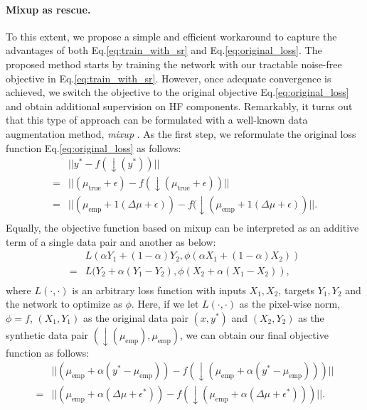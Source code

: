 \documentclass[letterpaper]{article} %
\begin{document}
\paragraph{Mixup as rescue.}
To this extent, we propose a simple and efficient workaround to capture the advantages of both Eq.\eqref{eq:train_with_sr} and Eq.\eqref{eq:original_loss}. The proposed method starts by training the network with our tractable noise-free objective in Eq.\eqref{eq:train_with_sr}. However, once adequate convergence is achieved, we switch the objective to the original objective Eq.\eqref{eq:original_loss} and obtain additional supervision on HF components. 
%
Remarkably, it turns out that this type of approach can be formulated with a well-known data augmentation method, \textit{mixup} \cite{mixup}. As the first step, we reformulate the original loss function Eq.\eqref{eq:original_loss} as follows:
\begin{equation}\label{eq:original_loss_in_mixupform}
    \begin{aligned}
        &||y^* - f(\downarrow(y^*))|| \\
        =&||(\mu_{\text{true}} + \epsilon) - f(\downarrow(\mu_{\text{true}} + \epsilon))|| \\
        =&||(\mu_{\text{emp}}+ 1(\Delta\mu+\epsilon)) - f(\downarrow(\mu_{\text{emp}} + 1(\Delta\mu+\epsilon))||. \\
    \end{aligned}
\end{equation}
Equally, the objective function based on mixup can be interpreted as an additive term of a single data pair and another as below:
\begin{equation}
    \begin{aligned}
        &L(\alpha Y_1 + (1-\alpha) Y_2, \phi(\alpha X_1 + (1-\alpha) X_2)) \\
        =&L(Y_2 + \alpha (Y_1 - Y_2), \phi(X_2 + \alpha (X_1 - X_2)), \\
    \end{aligned}
\end{equation}
where $L(\cdot,\cdot)$ is an arbitrary loss function with inputs $X_1, X_2$, targets $Y_1, Y_2$ and the network to optimize as $\phi$. Here, if we let $L(\cdot,\cdot)$ as the pixel-wise norm, $\phi=f$, $(X_1, Y_1)$ as the original data pair $(x, y^*)$ and $(X_2, Y_2)$ as the synthetic data pair $(\downarrow(\mu_\text{emp}),\mu_\text{emp})$, we can obtain our final objective function as follows:
\begin{equation}
    \label{eq:final_w_mixup}
    \begin{aligned}
        &||(\mu_{\text{emp}}+ \alpha(y^* - \mu_{\text{emp}})) - f(\downarrow(\mu_{\text{emp}}+ \alpha(y^* - \mu_{\text{emp}})))|| \\
        =&||(\mu_{\text{emp}}+ \alpha(\Delta\mu+\epsilon^*)) - f(\downarrow(\mu_{\text{emp}} + \alpha(\Delta\mu+\epsilon^*)))||
        .
    \end{aligned}
\end{equation}
\end{document}
